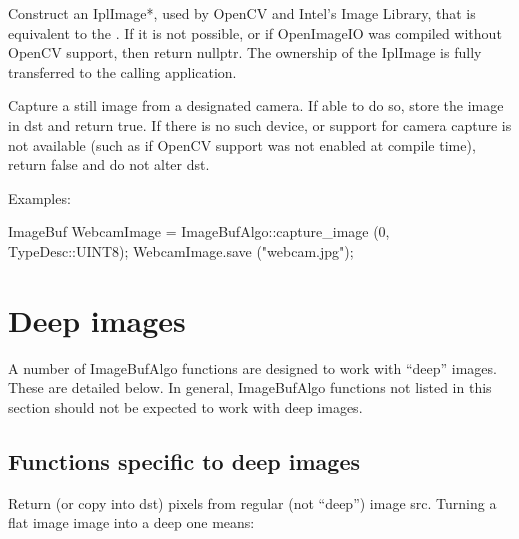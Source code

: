  
Construct an {\cf IplImage*}, used by OpenCV and Intel's Image Library,
that is equivalent to the .  If it is not possible, or
if OpenImageIO was compiled without OpenCV support, then return
{\cf nullptr}.  The ownership of the {\cf IplImage} is fully transferred to the
calling application.

\begin{comment}
\smallskip
\noindent Examples:
\begin{code}
\end{code}
\end{comment}
\apiend


 
Capture a still image from a designated camera.  If able to do so,
store the image in {\cf dst} and return {\cf true}.  If there is no such device,
or support for camera capture is not available (such as if OpenCV
support was not enabled at compile time), return {\cf false} and do not
alter {\cf dst}.

\smallskip
\noindent Examples:
\begin{code}
    ImageBuf WebcamImage = ImageBufAlgo::capture_image (0, TypeDesc::UINT8);
    WebcamImage.save ("webcam.jpg");
\end{code}
\apiend



\section{Deep images}
\label{sec:iba:deep}

A number of {\cf ImageBufAlgo} functions are designed to work with ``deep''
images. These are detailed below. In general, {\cf ImageBufAlgo} functions
not listed in this section should not be expected to work with deep images.

\subsection{Functions specific to deep images}

  
Return (or copy into {\cf dst}) pixels from regular (not ``deep'') image {\cf src}.
Turning a flat image image into a deep one means:

